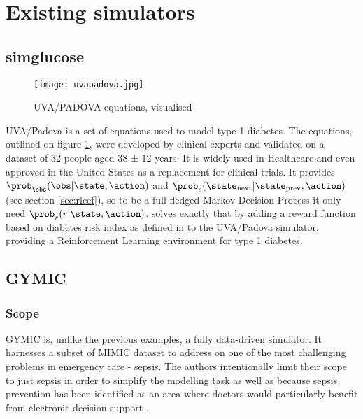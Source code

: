 \section{Existing simulators}
\label{sec:existing}

\subsection{simglucose}
\label{sec:simglucose}

\begin{figure}
    \centering
    \texttt{[image: uvapadova.jpg]}
    \caption{UVA/PADOVA equations, visualised}
    \label{fig:uvapadova}
\end{figure}

UVA/Padova \cite{sim-diabetes-fda} is a set of equations used to model type 1 diabetes.
The equations, outlined on figure \ref{fig:uvapadova}, were developed by clinical experts and validated on a dataset of 32 people aged 38 ± 12 years.
It is widely used in Healthcare and even approved in the United States as a replacement for clinical trials.
It provides $\prob_\obs(\obs | \state, \action)$ and $\prob_s(\state_\text{next} | \state_\text{prev}, \action)$ (see section \ref{sec:rlcef}), so to be a full-fledged Markov Decision Process it only need $\prob_r(r|\state,\action)$.
\cite{simglucose} solves exactly that by adding a reward function based on diabetes risk index as defined in \cite{diabetesrisk} to the UVA/Padova simulator, providing a Reinforcement Learning environment for type 1 diabetes.

\subsection{GYMIC}
\label{sec:gymic}

\subsubsection{Scope}
GYMIC \cite{gym-sepsis} is, unlike the previous examples, a fully data-driven simulator. 
It harnesses a subset of MIMIC \cite{johnsonMIMICIVFreelyAccessible2023} dataset to address on one of the most challenging problems in emergency care - sepsis.
The authors intentionally limit their scope to just sepsis in order to simplify the modelling task as well as because sepsis prevention has been identified as an area where doctors would particularly benefit from electronic decision support \cite{sepsis-motivation1,sepsis-motivation2}.

